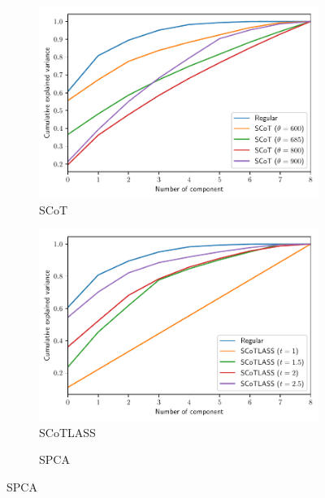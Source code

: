 \documentclass[11pt,letterpaper]{report}
\begin{document}
\begin{figure}
\caption{Cumulative Explained Variance per method}
\begin{subfigure}[H!]{0.49\textwidth}
    \centering
    \caption{SCoT}
    \label{fig:EV_SCoT}
    \includegraphics[scale = 0.5]{"../Figures/SCoT_comparison.pdf"}
\end{subfigure}
\begin{subfigure}[H!]{0.49\textwidth}
    \centering
    \caption{SCoTLASS}
    \label{fig:EV_SCoTLASS}
    \includegraphics[scale = 0.5]{"../Figures/SCoTLASS_comparison.pdf"}
\end{subfigure}
\begin{center}
\begin{subfigure}[H!]{0.49\textwidth}
    \centering
    \caption{SPCA}
    \label{fig:EV_SCoTLASS}

\end{subfigure}
\end{center}
\end{figure}
\end{document}
